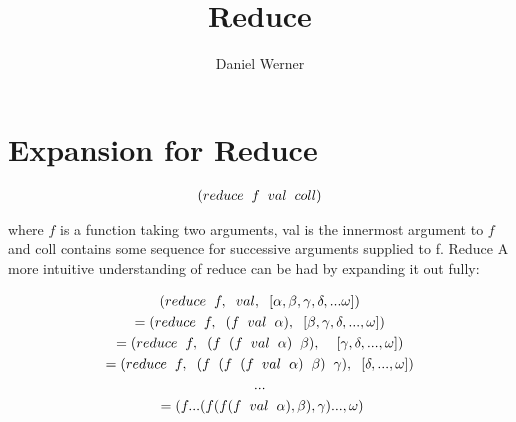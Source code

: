 \documentclass{article}
\title{Reduce}
\author{Daniel Werner}
\begin{document}
\maketitle

\section*{Expansion for Reduce}

\begin{gather*}
    (reduce \hspace{.2cm} f \hspace{.2cm} val \hspace{.2cm} coll)
\end{gather*}

where $f$ is a function taking two arguments, val is the innermost argument to $f$ and coll contains some sequence for successive arguments supplied to f.  Reduce   A more intuitive understanding of reduce can be had by expanding it out fully:

\begin{gather*}
    (reduce \hspace*{.2cm} f, \hspace*{.2cm} val, \hspace*{.2cm} [\alpha, \beta,\gamma,\delta,...\omega]) \\
    = (reduce \hspace*{.2cm} f, \hspace*{.2cm} (f \hspace*{.2cm} val \hspace*{.2cm} \alpha), \hspace*{.2cm} [\beta,\gamma,\delta,...,\omega]) \\
    = (reduce \hspace*{.2cm} f, \hspace*{.2cm} (f \hspace*{.2cm} (f \hspace*{.2cm}val \hspace*{.2cm} \alpha) \hspace*{.2cm} \beta), \hspace*{.2cm} \hspace*{.2cm} [\gamma,\delta,...,\omega]) \\
    = (reduce \hspace*{.2cm} f, \hspace*{.2cm} (f \hspace*{.2cm} (f \hspace*{.2cm} (f \hspace*{.2cm} val \hspace*{.2cm} \alpha) \hspace*{.2cm} \beta) \hspace*{.2cm} \gamma), \hspace*{.2cm} [\delta,...,\omega]) \\
    ... \\\
    = (f...(f(f(f \hspace*{.2cm} val  \hspace*{.2cm} \alpha), \beta), \gamma)..., \omega)
\end{gather*}
\end{document}
